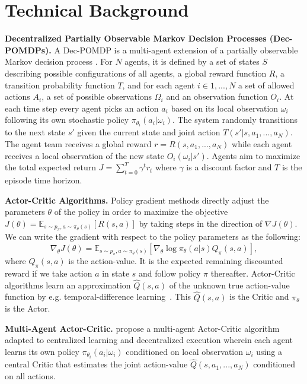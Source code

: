 \vspace{-10pt}
\section{Technical Background}
\label{sec:background}

\textbf{Decentralized Partially Observable Markov Decision Processes (Dec-POMDPs).}
A Dec-POMDP is a multi-agent extension of a partially observable Markov
decision process \cite{oliehoek_book12}. For $N$ agents, it is defined by a set of
states $S$ describing possible configurations of all agents, a global reward function
$R$, a transition probability function $T$, and for each agent $i \in {1,...,N}$ a
set of allowed actions $A_i$, a set of possible observations $\Omega_i$ and an
observation function $O_i$.
At each time step every agent picks an action $a_i$ based on its local observation
$\omega_i$ following its own stochastic policy $\pi_{\theta_i}(a_i | \omega_i)$.
The system randomly transitions to the next state $s'$ given the current state and
joint action $T(s' | s, a_1,...,a_N)$. The agent team receives a global reward
$r = R(s, a_1,...,a_N)$ while each agent receives a local observation of the new
state $O_i(\omega_i | s')$. Agents aim to maximize the total expected return
$J = \sum_{t=0}^T \gamma^t r_t$ where $\gamma$ is a discount factor and $T$ is
the episode time horizon.

\textbf{Actor-Critic Algorithms.} Policy gradient methods directly adjust the parameters
$\theta$ of the policy in order to maximize the objective
$J(\theta) = \mathbb{E}_{s \sim p_{\pi}, a \sim \pi_{\theta}(s)} \left[ R(s, a) \right]$
by taking steps in the direction of $\nabla J(\theta)$. We can write the gradient
with respect to the policy parameters as the following:
$$\nabla_{\theta} J(\theta) = \mathbb{E}_{s \sim p_{\pi}, a \sim \pi_{\theta}(s)} \left[ \nabla_{\theta }\log \pi_{\theta}(a | s) Q_{\pi} (s, a) \right],$$
where $Q_{\pi} (s, a)$ is the action-value. It is the expected remaining
discounted reward if we take action $a$ in state $s$ and follow policy $\pi$ thereafter.
Actor-Critic algorithms learn an approximation $\hat{Q}(s, a)$ of the unknown true
action-value function by e.g. temporal-difference learning~\citep{sutton_book98}.
This $\hat{Q}(s, a)$ is the Critic and $\pi_{\theta}$ is the Actor.

\textbf{Multi-Agent Actor-Critic.} \citet{lowe_nips17} propose a multi-agent Actor-Critic
algorithm adapted to centralized learning and decentralized execution wherein each
agent learns its own policy $\pi_{\theta_i}(a_i | \omega_i)$ conditioned on local
observation $\omega_i$ using a central Critic that estimates the joint
action-value $\hat{Q}(s, a_1, ..., a_N)$ conditioned on all actions.